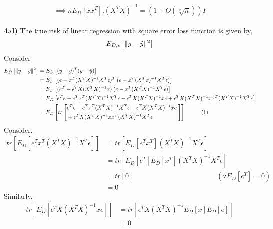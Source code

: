 \documentclass[17pt]{article}
\DeclarePairedDelimiter\norm{\lVert}{\rVert}%
\begin{document}
$$\implies nE_{D}[xx^{T}].(X^{T}X)^{-1} = (1+O(\sqrt[2]{n}))I$$\\
\textbf{4.d)} The true risk of linear regression with square error loss function is given by,
$$E_{D,\epsilon} \left[ \norm{y - \hat{y} }^2 \right]$$
Consider 
\begin{equation*}
\begin{split}
E_{D} \left[ \norm{y - \hat{y} }^2 \right] 
	&=	E_{D} \left[ (y - \hat{y})^{T} (y - \hat{y}) \right]\\
	&=	E_{D} \left[ (e - x^T(X^TX)^{-1}X^T\epsilon)^T \: 
		   			(e - x^T(X^Tx)^{-1}X^T\epsilon) \right]\\
	&=	E_{D} \left[ (e^T - \epsilon^T X(X^TX)^{-1}x) \: 
		   			(e - x^T(X^TX)^{-1}X^T\epsilon) \right]\\
	&=	E_{D} \left[ 
			e^Te - e^Tx^T(X^TX)^{-1}X^T\epsilon 
			- \epsilon^T X(X^TX)^{-1}xe 
			+ \epsilon^T X(X^TX)^{-1}xx^T(X^TX)^{-1}X^T\epsilon
		 \right]\\
	&=	E_{D} \left[ tr \left[{ 
		\begin{split}
		  &  e^Te - e^Tx^T(X^TX)^{-1}X^T\epsilon 
			- \epsilon^T X(X^TX)^{-1}xe \: \\
		  & + \epsilon^T X(X^TX)^{-1}xx^T(X^TX)^{-1}X^T\epsilon	 
		\end{split}
		}\right] \right] \hspace{1cm}(1) \\
\end{split}
\end{equation*}
Consider,
\begin{equation*}
\begin{split}
tr \left[E_{D} \left[e^Tx^T(X^TX)^{-1}X^T\epsilon \right]\right]
	&= tr \left[E_{D}\left[e^Tx^T\right]
					(X^TX)^{-1}X^T\epsilon \right]\\
	&= tr \left[E_{D}\left[e^T\right]E_{D}\left[x^T\right]								(X^TX)^{-1}X^T\epsilon \right]	\\
	&= tr \left[0 \right] \hspace{5cm} 
						(\because E_{D}\left[e^T\right] = 0)\\
	&= 0
\end{split}
\end{equation*}
Similarly,
\begin{equation*}
\begin{split}
tr \left[E_{D} \left[\epsilon^T X(X^TX)^{-1}xe \right]\right]
	&=	tr \left[\epsilon^T X(X^TX)^{-1}
		E_{D}\left[x \right] E_{D}\left[e\right] \right]\\
	&= 0 
\end{split}
\end{equation*}
\end{document}
